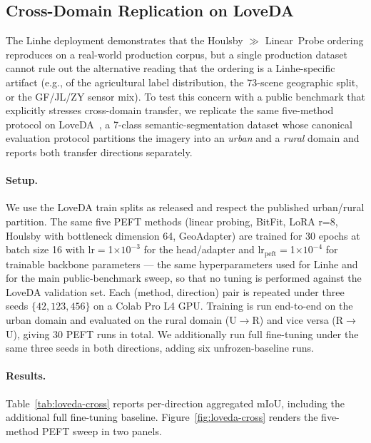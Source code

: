 \subsection{Cross-Domain Replication on LoveDA}
\label{sec:loveda}

The Linhe deployment demonstrates that the Houlsby $\gg$ Linear~Probe ordering reproduces on a real-world production corpus, but a single production dataset cannot rule out the alternative reading that the ordering is a Linhe-specific artifact (e.g., of the agricultural label distribution, the 73-scene geographic split, or the GF/JL/ZY sensor mix). To test this concern with a public benchmark that explicitly stresses cross-domain transfer, we replicate the same five-method protocol on LoveDA~\cite{wang2021loveda}, a 7-class semantic-segmentation dataset whose canonical evaluation protocol partitions the imagery into an \emph{urban} and a \emph{rural} domain and reports both transfer directions separately.

\paragraph{Setup.} We use the LoveDA train splits as released and respect the published urban/rural partition. The same five PEFT methods (linear probing, BitFit, LoRA r=8, Houlsby with bottleneck dimension 64, GeoAdapter) are trained for 30 epochs at batch size 16 with lr$=$1$\times 10^{-3}$ for the head/adapter and lr$_{\mathrm{peft}}$$=$1$\times 10^{-4}$ for trainable backbone parameters --- the same hyperparameters used for Linhe and for the main public-benchmark sweep, so that no tuning is performed against the LoveDA validation set. Each (method, direction) pair is repeated under three seeds $\{42, 123, 456\}$ on a Colab Pro L4 GPU. Training is run end-to-end on the urban domain and evaluated on the rural domain (U$\rightarrow$R) and vice versa (R$\rightarrow$U), giving 30 PEFT runs in total. We additionally run full fine-tuning under the same three seeds in both directions, adding six unfrozen-baseline runs.

\paragraph{Results.} Table~\ref{tab:loveda-cross} reports per-direction aggregated mIoU, including the additional full fine-tuning baseline. Figure~\ref{fig:loveda-cross} renders the five-method PEFT sweep in two panels.

